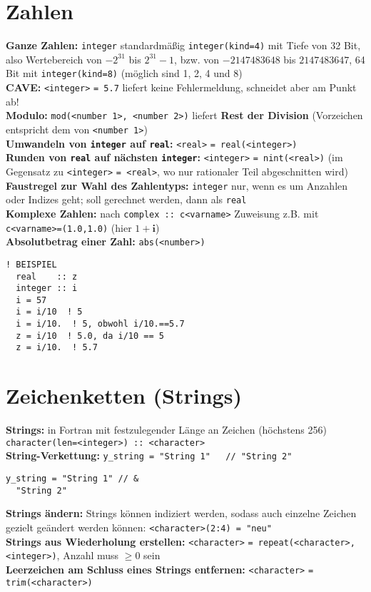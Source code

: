 \documentclass[a4paper, twocolumn]{scrarticle}
\begin{document}
\section{Zahlen}
\textbf{Ganze Zahlen:} \lstinline|integer| standardmäßig \lstinline|integer(kind=4)| mit Tiefe von 32 Bit, also Wertebereich von $-2^{31}$ bis $2^{31}-1$, bzw. von $-2147483648$ bis $2147483647$, 64 Bit mit \lstinline|integer(kind=8)| (möglich sind 1, 2, 4 und 8)\\
\textbf{CAVE:} \lstinline|<integer>| \lstinline|= 5.7| liefert keine Fehlermeldung, schneidet aber am Punkt ab!\\
\textbf{Modulo:} \lstinline|mod(<number 1>, <number 2>)| liefert \textbf{Rest der Division} (Vorzeichen entspricht dem von \lstinline|<number 1>|) \\
\textbf{Umwandeln von \lstinline|integer| auf \lstinline|real|:} \lstinline|<real>| \lstinline|= real(<integer>)|\\
\textbf{Runden von \lstinline|real| auf nächsten \lstinline|integer|:} \lstinline|<integer>| \lstinline|= nint(<real>)| (im Gegensatz zu \lstinline|<integer>| \lstinline|= <real>|, wo nur rationaler Teil abgeschnitten wird)\\
\textbf{Faustregel zur Wahl des Zahlentyps:} \lstinline|integer| nur, wenn es um Anzahlen oder Indizes geht; soll gerechnet werden, dann als \lstinline|real|\\
\textbf{Komplexe Zahlen:} nach \lstinline|complex :: c<varname>| Zuweisung z.B. mit \lstinline|c<varname>=(1.0,1.0)| (hier $1+\textbf{i}$)\\
\textbf{Absolutbetrag einer Zahl:} \lstinline|abs(<number>)|
\begin{lstlisting}[caption={\bfseries Beispiel: CAVE - implizite Umwandlungen bei Division}]
  ! BEISPIEL
  real    :: z
  integer :: i
  i = 57
  i = i/10  ! 5
  i = i/10.  ! 5, obwohl i/10.==5.7
  z = i/10  ! 5.0, da i/10 == 5
  z = i/10.  ! 5.7
\end{lstlisting}

\section{Zeichenketten (\glqq Strings\grqq)}
\textbf{Strings:} in Fortran mit festzulegender Länge an Zeichen  (höchstens 256) \lstinline|character(len=<integer>) :: <character>|\\
\textbf{String-Verkettung:} \lstinline|y_string = "String 1"   // "String 2"|
\begin{lstlisting}[caption={\bfseries Beispiel: String-Verkettung über Code-Zeilen hinweg},label=lst:stringkette]
  y_string = "String 1" // &
  "String 2"
\end{lstlisting}
\textbf{Strings ändern:} Strings können indiziert werden, sodass auch einzelne Zeichen gezielt geändert werden können: \lstinline|<character>(2:4) = "neu"|\\
\textbf{Strings aus Wiederholung erstellen:} \lstinline|<character>| \lstinline|= repeat(<character>, <integer>)|, Anzahl muss $\geq 0$ sein\\
\textbf{Leerzeichen am Schluss eines Strings entfernen:} \lstinline|<character>| \lstinline|= trim(<character>)|
\end{document}
